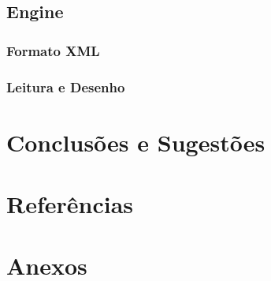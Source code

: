 \documentclass[a4paper]{article}
\begin{document}
\subsection{Engine}

\subsubsection{Formato XML}

\subsubsection{Leitura e Desenho}

\section{Conclusões e Sugestões}


\section{Referências}


\section{Anexos}
\end{document}
